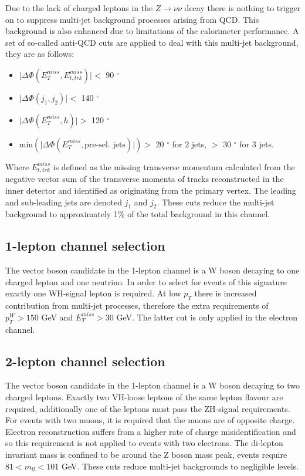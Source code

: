 Due to the lack of charged leptons in the $Z \rightarrow \nu\nu$ decay there is
nothing to trigger on to suppress multi-jet background processes arising from
QCD. This background is also enhanced due to limitations of the calorimeter
performance. A set of so-called anti-QCD cuts are applied to deal with this
multi-jet background, they are as follows:
\begin{itemize}
\item $\lvert \Delta \Phi ( E_T^{miss} , E_{t, trk}^{miss} ) \rvert <$ 90 $^\circ$
\item $\lvert \Delta \Phi ( j_1 , j_2 ) \rvert <$ 140 $^\circ$
\item $\lvert \Delta \Phi ( E_T^{miss} , h ) \rvert >$ 120 $^\circ$
\item $\text{min} ( \lvert \Delta \Phi ( E_T^{miss} , \text{pre-sel. jets}) \rvert ) >$ 20 $^\circ$ for  2 jets, $>$ 30 $^\circ$ for 3 jets.
\end{itemize}
Where $E_{t, trk}^{miss}$ is defined as the missing transverse momentum
calculated from the negative vector sum of the transverse momenta of tracks
reconstructed in the inner detector and identified as originating from the
primary vertex. The leading and sub-leading jets are denoted $j_1$ and $j_2$.
These cuts reduce the multi-jet background to approximately 1\% of the total
background in this channel.


\subsection{1-lepton channel selection}
\label{sec:1lep-selection}

The vector boson candidate in the 1-lepton channel is a W boson decaying to one
charged lepton and one neutrino. In order to select for events of this signature
exactly one WH-signal lepton is required. At low $p_T$ there is increased
contribution from multi-jet processes, therefore the extra requirements of
$p_T^{W} > 150$ GeV and $E_T^{miss} > 30$ GeV. The latter cut is only applied in
the electron channel.  

\subsection{2-lepton channel selection}
\label{sec:2lep-selection}

The vector boson candidate in the 1-lepton channel is a W boson decaying to two
charged leptons. Exactly two VH-loose leptons of the same lepton flavour are
required, additionally one of the leptons must pass the ZH-signal requirements.
For events with two muons, it is required that the muons are of opposite charge.
Electron reconstruction suffers from a higher rate of charge misidentification
and so this requirement is not applied to events with two electrons. The
di-lepton invariant mass is confined to be around the Z boson mass peak, events
require $81 < m_{ll} < 101$ GeV. These cuts reduce multi-jet backgrounds to
negligible levels. 

